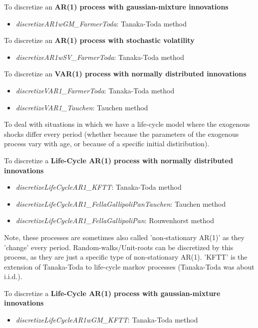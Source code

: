 \smallskip
To discretize an \textbf{AR(1) process with gaussian-mixture innovations}
\begin{itemize}
 \item \textit{discretizeAR1wGM\_{}FarmerToda}: Tanaka-Toda method
\end{itemize}

\smallskip
To discretize an \textbf{AR(1) process with stochastic volatility}
\begin{itemize}
 \item \textit{discretizeAR1wSV\_{}FarmerToda}: Tanaka-Toda method
\end{itemize}

\smallskip
To discretize an \textbf{VAR(1) process with normally distributed innovations}
\begin{itemize}
 \item \textit{discretizeVAR1\_{}FarmerToda}: Tanaka-Toda method
 \item \textit{discretizeVAR1\_{}Tauchen}: Tauchen method
\end{itemize}

To deal with situations in which we have a life-cycle model where the exogenous shocks differ every period (whether because the parameters of the exogenous process vary with age, or because of a specific initial distiribution).

\smallskip
To discretize a \textbf{Life-Cycle AR(1) process with normally distributed innovations}
\begin{itemize}
 \item \textit{discretizeLifeCycleAR1\_{}KFTT}: Tanaka-Toda method
 \item \textit{discretizeLifeCycleAR1\_{}FellaGallipoliPanTauchen}: Tauchen method
 \item \textit{discretizeLifeCycleAR1\_{}FellaGallipoliPan}: Rouwenhorst method
\end{itemize}
Note, these processes are sometimes also called 'non-stationary AR(1)' as they 'change' every period. Random-walks/Unit-roots can be discretized by this process, as they are just a specific type of non-stationary AR(1). 'KFTT' is the extension of Tanaka-Toda to life-cycle markov processes (Tanaka-Toda was about i.i.d.).

\smallskip
To discretize a \textbf{Life-Cycle AR(1) process with gaussian-mixture innovations}
\begin{itemize}
 \item \textit{discretizeLifeCycleAR1wGM\_{}KFTT}: Tanaka-Toda method
\end{itemize}

